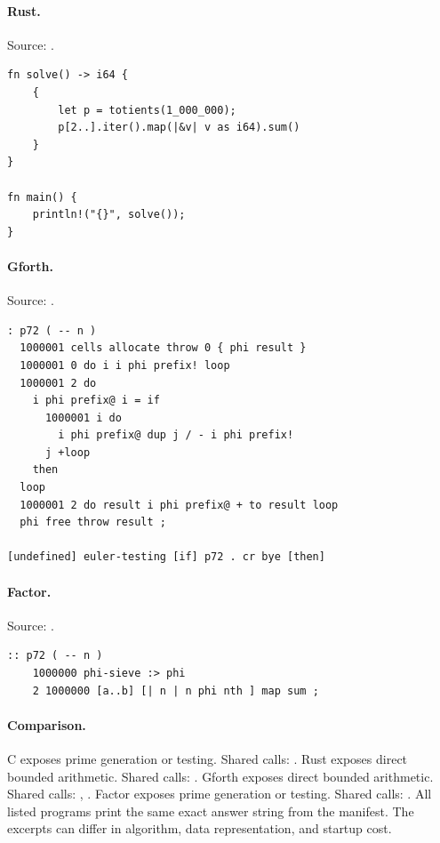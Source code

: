 \paragraph{Rust.} Source: .
\begin{lstlisting}
fn solve() -> i64 {
    {
        let p = totients(1_000_000);
        p[2..].iter().map(|&v| v as i64).sum()
    }
}

fn main() {
    println!("{}", solve());
}
\end{lstlisting}

\paragraph{Gforth.} Source: .
\begin{lstlisting}
: p72 ( -- n )
  1000001 cells allocate throw 0 { phi result }
  1000001 0 do i i phi prefix! loop
  1000001 2 do
    i phi prefix@ i = if
      1000001 i do
        i phi prefix@ dup j / - i phi prefix!
      j +loop
    then
  loop
  1000001 2 do result i phi prefix@ + to result loop
  phi free throw result ;

[undefined] euler-testing [if] p72 . cr bye [then]
\end{lstlisting}

\paragraph{Factor.} Source: .
\begin{lstlisting}
:: p72 ( -- n )
    1000000 phi-sieve :> phi
    2 1000000 [a..b] [| n | n phi nth ] map sum ;
\end{lstlisting}

\paragraph{Comparison.}
C exposes prime generation or testing. Shared calls: \texttt{}. Rust exposes direct bounded arithmetic. Shared calls: \texttt{}. Gforth exposes direct bounded arithmetic. Shared calls: \texttt{}, \texttt{}. Factor exposes prime generation or testing. Shared calls: \texttt{}.
All listed programs print the same exact answer string from the manifest. The excerpts can differ in algorithm, data representation, and startup cost.

